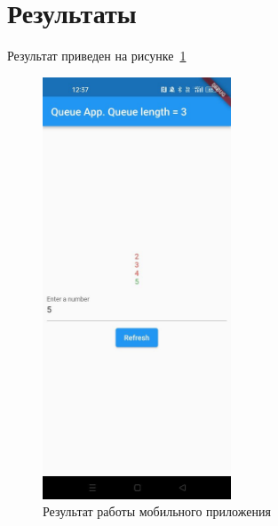 \documentclass[a4paper, 14pt]{extarticle}
\begin{document}
\section{Результаты}

Результат приведен на рисунке~\ref{fig:img1}

\begin{figure}[H]
\centering
\includegraphics[width=0.5\textwidth]{images/res1.jpg}
\caption{Результат работы мобильного приложения}
\label{fig:img1}
\end{figure}
\end{document}
